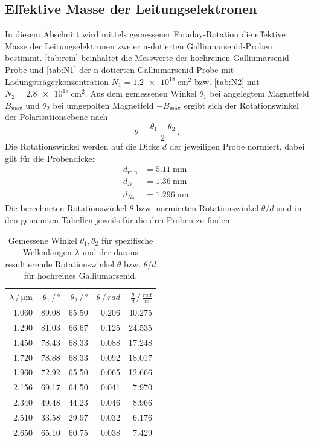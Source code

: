\subsection{Effektive Masse der Leitungselektronen}
In diesem Abschnitt wird mittels gemessener Faraday-Rotation die effektive Masse der Leitungselektronen zweier n-dotierten Galliumarsenid-Proben bestimmt.
\autoref{tab:rein} beinhaltet die Messwerte der hochreinen Galliumarsenid-Probe und \autoref{tab:N1} der n-dotierten Galliumarsenid-Probe mit Ladungsträgerkonzentration $N_1 = \qty{1.2e18}{\centi\metre^2}$ bzw. \autoref{tab:N2} mit $N_2 = \qty{2.8e18}{\centi\metre^2}$.
Aus dem gemessenen Winkel $\theta_1$ bei angelegtem Magnetfeld $B_\text{max}$ und $\theta_2$ bei umgepolten Magnetfeld $-B_\text{max}$ ergibt sich der Rotationswinkel der Polarisationsebene nach
\begin{equation*}
    \theta = \frac{\theta_1 - \theta_2}{2} \, .
\end{equation*}
Die Rotationswinkel werden auf die Dicke $d$ der jeweiligen Probe normiert, dabei gilt für die Probendicke:
\begin{align}
    d_\text{rein} &= \qty{5.11}{\milli\metre} \\
    d_{N_1} &= \qty{1.36}{\milli\metre} \\
    d_{N_2} &= \qty{1.296}{\milli\metre}
\end{align}
Die berechneten Rotationswinkel $\theta$ bzw. normierten Rotationswinkel $\theta / d$ sind in den genannten Tabellen jeweils für die drei Proben zu finden.
\begin{table}
    \centering
    \caption{Gemessene Winkel $\theta_1, \theta_2$ für spezifische Wellenlängen $\lambda$ und der daraus resultierende Rotationswinkel $\theta$ bzw. $\theta/d$ für hochreines Galliumarsenid.}
    \label{tab:rein}
    \begin{tabular}{r r r r r}
        \toprule
        $\lambda \,/\, \unit{\micro\metre}$ & $\theta_1 \,/\, \unit{\degree}$ & $\theta_2 \,/\, \unit{\degree}$ & $\theta \,/\, \unit{rad}$ & $\frac{\theta}{d} \,/\, \frac{rad}{\unit{\metre}}$ \\
        \midrule
        1.060 & 89.08 & 65.50 & 0.206 & 40.275 \\
        1.290 & 81.03 & 66.67 & 0.125 & 24.535 \\
        1.450 & 78.43 & 68.33 & 0.088 & 17.248 \\
        1.720 & 78.88 & 68.33 & 0.092 & 18.017 \\
        1.960 & 72.92 & 65.50 & 0.065 & 12.666 \\
        2.156 & 69.17 & 64.50 & 0.041 & 7.970 \\
        2.340 & 49.48 & 44.23 & 0.046 & 8.966 \\
        2.510 & 33.58 & 29.97 & 0.032 & 6.176 \\
        2.650 & 65.10 & 60.75 & 0.038 & 7.429 \\
        \bottomrule
    \end{tabular}
\end{table}

